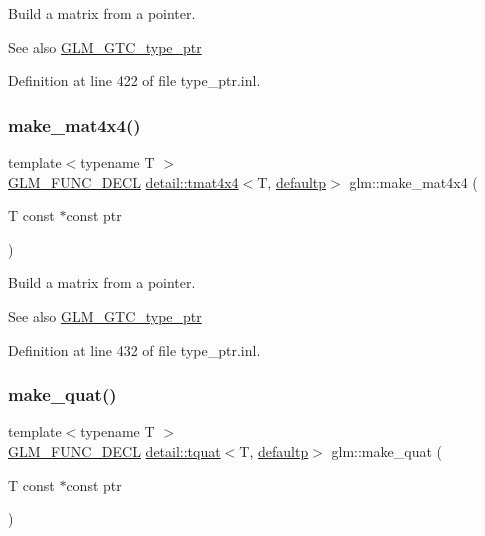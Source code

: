 Build a matrix from a pointer. \begin{DoxySeeAlso}{See also}
\hyperlink{group__gtc__type__ptr}{G\+L\+M\+\_\+\+G\+T\+C\+\_\+type\+\_\+ptr} 
\end{DoxySeeAlso}


Definition at line 422 of file type\+\_\+ptr.\+inl.

\mbox{\label{group__gtc__type__ptr_ga4b13ff6840a66d032724a9a1db50f704}} 
\subsubsection{\texorpdfstring{make\+\_\+mat4x4()}{make\_mat4x4()}}
{\footnotesize\ttfamily template$<$typename T $>$ \\
\hyperlink{setup_8hpp_ab2d052de21a70539923e9bcbf6e83a51}{G\+L\+M\+\_\+\+F\+U\+N\+C\+\_\+\+D\+E\+CL} \hyperlink{structglm_1_1detail_1_1tmat4x4}{detail\+::tmat4x4}$<$T, \hyperlink{namespaceglm_a0f04f086094c747d227af4425893f545a9d21ccd8b5a009ec7eb7677befc3bf51}{defaultp}$>$ glm\+::make\+\_\+mat4x4 (\begin{DoxyParamCaption}\item[{T const $\ast$const}]{ptr }\end{DoxyParamCaption})}

Build a matrix from a pointer. \begin{DoxySeeAlso}{See also}
\hyperlink{group__gtc__type__ptr}{G\+L\+M\+\_\+\+G\+T\+C\+\_\+type\+\_\+ptr} 
\end{DoxySeeAlso}


Definition at line 432 of file type\+\_\+ptr.\+inl.

\mbox{\label{group__gtc__type__ptr_ga051ec24a44af31a08b11eccbf8726b02}} 
\subsubsection{\texorpdfstring{make\+\_\+quat()}{make\_quat()}}
{\footnotesize\ttfamily template$<$typename T $>$ \\
\hyperlink{setup_8hpp_ab2d052de21a70539923e9bcbf6e83a51}{G\+L\+M\+\_\+\+F\+U\+N\+C\+\_\+\+D\+E\+CL} \hyperlink{structglm_1_1detail_1_1tquat}{detail\+::tquat}$<$T, \hyperlink{namespaceglm_a0f04f086094c747d227af4425893f545a9d21ccd8b5a009ec7eb7677befc3bf51}{defaultp}$>$ glm\+::make\+\_\+quat (\begin{DoxyParamCaption}\item[{T const $\ast$const}]{ptr }\end{DoxyParamCaption})}

